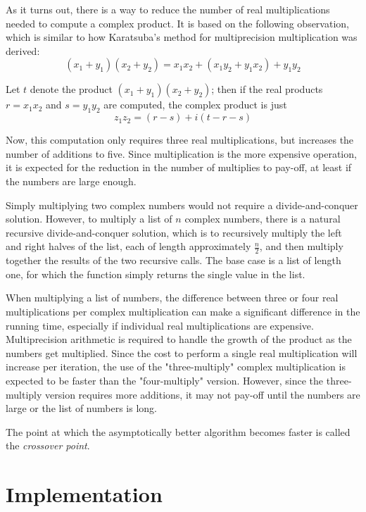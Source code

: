 \documentclass[usletter, 12pt]{article}
\begin{document}
        As it turns out, there is a way to reduce the number of real multiplications needed to compute a complex product. It is based on the following observation, which is similar to how Karatsuba's method for multiprecision multiplication was derived:
            \[ (x_{1}+y_{1})(x_{2}+y_{2})=x_{1}x_{2}+(x_{1}y_{2}+y_{1}x_{2})+y_{1}y_{2} \]

        Let $t$ denote the product $(x_{1}+y_{1})(x_{2}+y_{2})$; then if the real products $r=x_{1}x_{2}$ and $s=y_{1}y_{2}$ are computed, the complex product is just
            \[ z_{1}z_{2}=(r-s)+i(t-r-s) \]

        Now, this computation only requires three real multiplications, but increases the number of additions to five. Since multiplication is the more expensive operation, it is expected for the reduction in the number of multiplies to pay-off, at least if the numbers are large enough.

        Simply multiplying two complex numbers would not require a divide-and-conquer solution. However, to multiply a list of $n$ complex numbers, there is a natural recursive divide-and-conquer solution, which is to recursively multiply the left and right halves of the list, each of length approximately $\frac{n}{2}$, and then multiply together the results of the two recursive calls. The base case is a list of length one, for which the function simply returns the single value in the list.

        When multiplying a list of numbers, the difference between three or four real multiplications per complex multiplication can make a significant difference in the running time, especially if individual real multiplications are expensive. Multiprecision arithmetic is required to handle the growth of the product as the numbers get multiplied. Since the cost to perform a single real multiplication will increase per iteration, the use of the "three-multiply" complex multiplication is expected to be faster than the "four-multiply" version. However, since the three-multiply version requires more additions, it may not pay-off until the numbers are large or the list of numbers is long.

        The point at which the asymptotically better algorithm becomes faster is called the \textit{crossover point}.

    \section{Implementation}
\end{document}
